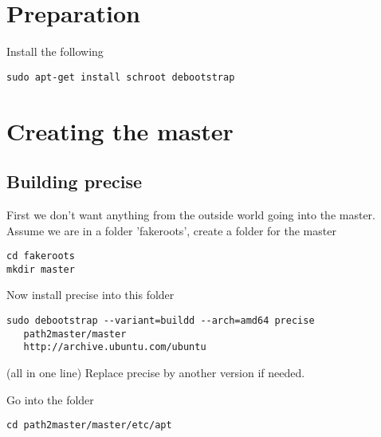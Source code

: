 \documentclass[a4paper]{article}
\begin{document}
\section{Preparation}

Install the following

\begin{verbatim}
sudo apt-get install schroot debootstrap
\end{verbatim}


\section{Creating the master}
\subsection{Building precise}
First we don't want anything from the outside world going into the master.
Assume we are in a folder 'fakeroots', create a folder for the master

\begin{verbatim}
cd fakeroots
mkdir master
\end{verbatim}

Now install precise into this folder

\begin{verbatim}
sudo debootstrap --variant=buildd --arch=amd64 precise 
   path2master/master 
   http://archive.ubuntu.com/ubuntu
\end{verbatim}

(all in one line)
Replace precise by another version if needed.

Go into the folder

\begin{verbatim}
cd path2master/master/etc/apt
\end{verbatim}
\end{document}
